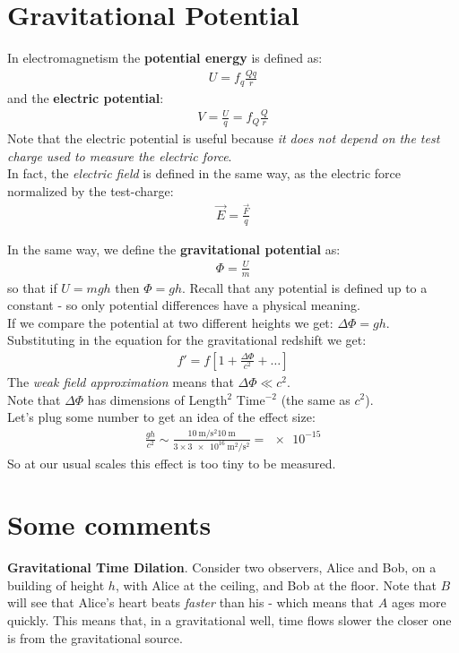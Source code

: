 \documentclass[../template.tex]{subfiles}
\begin{document}
\section{Gravitational Potential}
In electromagnetism the \textbf{potential energy} is defined as:
\begin{align*}
    U = f_q \frac{Q q}{r} 
\end{align*} 
and the \textbf{electric potential}:
\begin{align*}
    V = \frac{U}{q} = f_Q \frac{Q}{r}  
\end{align*} 
Note that the electric potential is useful because \textit{it does not depend on the test charge used to measure the electric force}.\\
In fact, the \textit{electric field} is defined in the same way, as the electric force normalized by the test-charge:
\begin{align*}
    \vec{E} = \frac{\vec{F}}{q} 
\end{align*}  

In the same way, we define the \textbf{gravitational potential} as:
\begin{align*}
    \Phi = \frac{U}{m}
\end{align*} 
so that if $U = mgh$ then $\Phi = gh$. Recall that any potential is defined up to a constant - so only potential differences have a physical meaning.\\
If we compare the potential at two different heights we get: $\Delta \Phi= gh$. Substituting in the equation for the gravitational redshift we get:
\begin{align*}
    f' = f \left[1+\frac{\Delta \Phi}{c^2} + \dots \right]
\end{align*}
The \textit{weak field approximation} means that $\Delta \Phi \ll c^2$.\\

Note that $\Delta \Phi$ has dimensions of Length$^2$ Time$^{-2}$ (the same as $c^2$).\\
Let's plug some number to get an idea of the effect size:
\begin{align*}
    \frac{gh}{c^2} \sim \frac{\SI{10}{\m\per\s\squared} \SI{10}{\m}}{3 \times \SI{3e16}{\m\squared\per\s\squared}} = \num{e-15}  
\end{align*} 
So at our usual scales this effect is too tiny to be measured.

\section{Some comments}
\textbf{Gravitational Time Dilation}. 
Consider two observers, Alice and Bob, on a building of height $h$, with Alice at the ceiling, and Bob at the floor. Note that $B$ will see that Alice's heart beats \textit{faster} than his - which means that $A$ ages more quickly. This means that, in a gravitational well, time flows slower the closer one is from the gravitational source.\\
\end{document}
